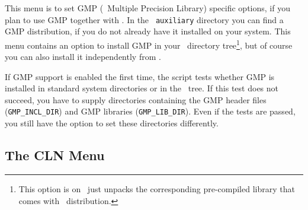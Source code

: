 This menu is to set GMP (\gnu\ Multiple Precision Library) specific
options, if you plan to use GMP together with \cgal . In the {\tt
  auxiliary} directory you can find a GMP distribution, if you do not
already have it installed on your system. This menu contains an option
to install GMP in your \cgal\ directory tree\footnote{This option is
  on \msvc\ just unpacks the corresponding pre-compiled library that
  comes with \cgal\ distribution.}, but of course you can also install
it independently from \cgal .

If GMP support is enabled the first time, the script tests whether GMP
is installed in standard system directories or in the \cgal\ tree. If
this test does not succeed, you have to supply directories containing
the GMP header files (\texttt{GMP\_INCL\_DIR})
and GMP libraries ({\tt GMP\_LIB\_DIR}).  Even
if the tests are passed, you still have the option to set these
directories differently.\bigskip


\subsection{The CLN Menu}\label{sec:cln-menu}

